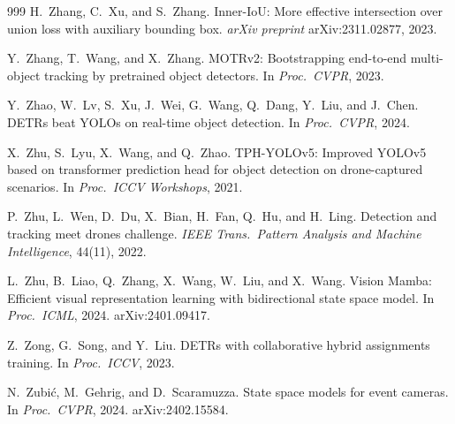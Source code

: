 \begin{thebibliography}{999}
H.~Zhang, C.~Xu, and S.~Zhang.
Inner-IoU: More effective intersection over union loss with auxiliary bounding
box. \textit{arXiv preprint} arXiv:2311.02877, 2023.

Y.~Zhang, T.~Wang, and X.~Zhang.
MOTRv2: Bootstrapping end-to-end multi-object tracking by pretrained object
detectors. In \textit{Proc.\ CVPR}, 2023.

Y.~Zhao, W.~Lv, S.~Xu, J.~Wei, G.~Wang, Q.~Dang, Y.~Liu, and J.~Chen.
DETRs beat YOLOs on real-time object detection.
In \textit{Proc.\ CVPR}, 2024.

X.~Zhu, S.~Lyu, X.~Wang, and Q.~Zhao.
TPH-YOLOv5: Improved YOLOv5 based on transformer prediction head for object
detection on drone-captured scenarios. In \textit{Proc.\ ICCV Workshops}, 2021.

P.~Zhu, L.~Wen, D.~Du, X.~Bian, H.~Fan, Q.~Hu, and H.~Ling.
Detection and tracking meet drones challenge.
\textit{IEEE Trans.\ Pattern Analysis and Machine Intelligence}, 44(11), 2022.

L.~Zhu, B.~Liao, Q.~Zhang, X.~Wang, W.~Liu, and X.~Wang.
Vision Mamba: Efficient visual representation learning with bidirectional
state space model. In \textit{Proc.\ ICML}, 2024. arXiv:2401.09417.

Z.~Zong, G.~Song, and Y.~Liu.
DETRs with collaborative hybrid assignments training.
In \textit{Proc.\ ICCV}, 2023.

N.~Zubi\'c, M.~Gehrig, and D.~Scaramuzza.
State space models for event cameras.
In \textit{Proc.\ CVPR}, 2024. arXiv:2402.15584.

\end{thebibliography}
